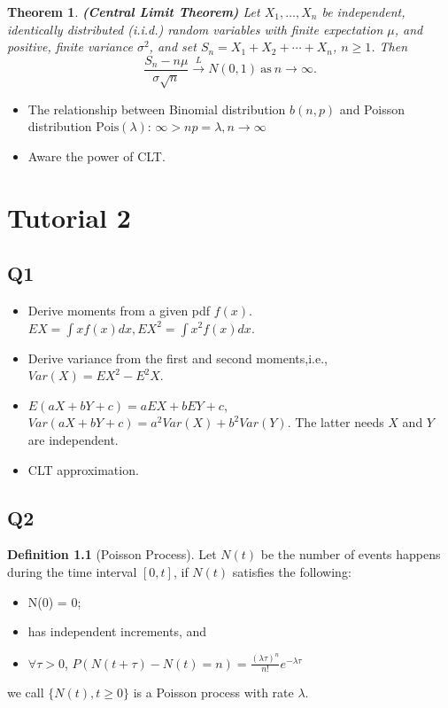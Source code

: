 \documentclass[
]{book}
\providecommand{\tightlist}{%
  \setlength{\itemsep}{0pt}\setlength{\parskip}{0pt}}
\newtheorem{theorem}{Theorem}[chapter]
\theoremstyle{definition}
\newtheorem{definition}{Definition}[chapter]
\theoremstyle{definition}
\theoremstyle{definition}
\theoremstyle{remark}
\begin{document}
\begin{theorem}
\protect\hypertarget{thm:clt}{}{\label{thm:clt} }\textbf{(Central Limit Theorem)} Let \(X_1,\ldots,X_n\) be independent, identically
distributed (i.i.d.) random variables with finite expectation \(\mu\), and
positive, finite variance \(\sigma^2\), and set \(S_n=X_1 + X_2 + \cdots + X_n\), \(n \ge 1\). Then
\[
    \frac{S_n - n\mu}{\sigma \sqrt{n}}\xrightarrow{L} N(0, 1)
    ~\mathrm{as}~n\rightarrow\infty.
\]
\end{theorem}

\begin{itemize}
\item
  The relationship between Binomial distribution \(b(n,p)\) and Poisson distribution \(\mathrm{Pois}(\lambda)\): \(\infty > np = \lambda, n\rightarrow\infty\)
\item
  Aware the power of CLT.
\end{itemize}

\hypertarget{sec:T2}{%
\chapter{Tutorial 2}\label{sec:T2}}

\hypertarget{q1-1}{%
\section{Q1}\label{q1-1}}

\begin{itemize}
\item
  Derive moments from a given pdf \(f(x)\). \(EX = \int xf(x)dx, EX^2=\int x^2f(x)dx\).
\item
  Derive variance from the first and second moments,i.e., \(Var(X)=EX^2-E^2X\).
\item
  \(E(aX+bY+c) = aEX + bEY+c\), \(Var(aX+bY+c) = a^2Var(X)+b^2Var(Y)\). The latter needs \(X\) and \(Y\) are independent.
\item
  CLT approximation.
\end{itemize}

\hypertarget{q2-1}{%
\section{Q2}\label{q2-1}}

\begin{definition}[Poisson Process]
\protect\hypertarget{def:unnamed-chunk-1}{}{\label{def:unnamed-chunk-1} \iffalse (Poisson Process) \fi{} }Let \(N(t)\) be the number of events happens during the time interval \([0,t]\), if \(N(t)\) satisfies the following:

\begin{itemize}
\tightlist
\item
  N(0) = 0;
\item
  has independent increments, and
\item
  \(\forall \tau>0\), \(P(N(t+\tau)-N(t) = n)= \frac{(\lambda \tau)^n}{n!}e^{-\lambda \tau}\)
\end{itemize}

we call \(\{N(t),t\geq0\}\) is a Poisson process with rate \(\lambda\).
\end{definition}
\end{document}
